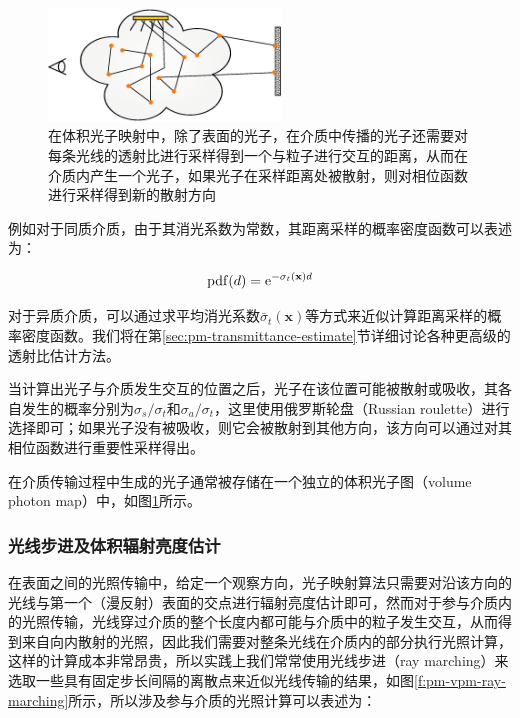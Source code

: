 \begin{figure}
	\sidecaption
	\includegraphics[width=0.55\textwidth]{figures/pm/volumetric-photon-tracing}
	\caption{在体积光子映射中，除了表面的光子，在介质中传播的光子还需要对每条光线的透射比进行采样得到一个与粒子进行交互的距离，从而在介质内产生一个光子，如果光子在采样距离处被散射，则对相位函数进行采样得到新的散射方向}
	\label{f:pm-volumetric-photon-tracing}
\end{figure}

例如对于同质介质，由于其消光系数为常数，其距离采样的概率密度函数可以表述为：

\begin{equation}
	{\rm pdf}(d)={\rm e}^{-\sigma_t(\mathbf{x})d}
\end{equation}

对于异质介质，可以通过求平均消光系数$\bar{\sigma}_t(\mathbf{x})$等方式来近似计算距离采样的概率密度函数。我们将在第\ref{sec:pm-transmittance-estimate}节详细讨论各种更高级的透射比估计方法。

当计算出光子与介质发生交互的位置之后，光子在该位置可能被散射或吸收，其各自发生的概率分别为$\sigma_s/\sigma_t$和$\sigma_a/\sigma_t$，这里使用俄罗斯轮盘（Russian roulette）进行选择即可；如果光子没有被吸收，则它会被散射到其他方向，该方向可以通过对其相位函数进行重要性采样得出。

在介质传输过程中生成的光子通常被存储在一个独立的体积光子图（volume photon map）中，如图\ref{f:pm-volumetric-photon-tracing}所示。






\subsubsection{光线步进及体积辐射亮度估计}
在表面之间的光照传输中，给定一个观察方向，光子映射算法只需要对沿该方向的光线与第一个（漫反射）表面的交点进行辐射亮度估计即可，然而对于参与介质内的光照传输，光线穿过介质的整个长度内都可能与介质中的粒子发生交互，从而得到来自向内散射的光照，因此我们需要对整条光线在介质内的部分执行光照计算，这样的计算成本非常昂贵，所以实践上我们常常使用光线步进（ray marching）来选取一些具有固定步长间隔的离散点来近似光线传输的结果，如图\ref{f:pm-vpm-ray-marching}所示，所以涉及参与介质的光照计算可以表述为：

